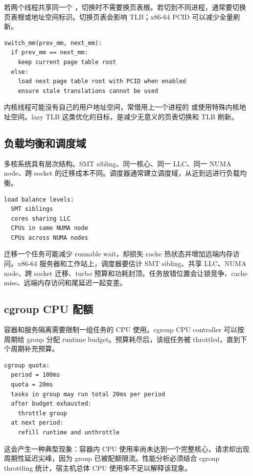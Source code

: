 若两个线程共享同一个 ，切换时不需要换页表根。若切到不同进程，通常要切换页表根或地址空间标识。切换页表会影响 TLB；x86-64 PCID 可以减少全量刷新。

\begin{lstlisting}
switch_mm(prev_mm, next_mm):
  if prev_mm == next_mm:
    keep current page table root
  else:
    load next page table root with PCID when enabled
    ensure stale translations cannot be used
\end{lstlisting}

内核线程可能没有自己的用户地址空间，常借用上一个进程的  或使用特殊内核地址空间。lazy TLB 这类优化的目标，是减少无意义的页表切换和 TLB 刷新。

\subsection{负载均衡和调度域}

多核系统具有层次结构。SMT sibling、同一核心、同一 LLC、同一 NUMA node、跨 socket 的迁移成本不同。调度器通常建立调度域，从近到远进行负载均衡。

\begin{lstlisting}
load balance levels:
  SMT siblings
  cores sharing LLC
  CPUs in same NUMA node
  CPUs across NUMA nodes
\end{lstlisting}

迁移一个任务可能减少 runnable wait，却损失 cache 热状态并增加远端内存访问。x86-64 服务器和工作站上，调度器要估计 SMT sibling、共享 LLC、NUMA node、跨 socket 迁移、turbo 预算和功耗封顶。任务放错位置会让锁竞争、cache miss、远端内存访问和尾延迟一起变差。

\subsection{cgroup CPU 配额}

容器和服务隔离需要限制一组任务的 CPU 使用。cgroup CPU controller 可以按周期给 group 分配 runtime budget。预算耗尽后，该组任务被 throttled，直到下个周期补充预算。

\begin{lstlisting}
cgroup quota:
  period = 100ms
  quota = 20ms
  tasks in group may run total 20ms per period
  after budget exhausted:
    throttle group
  at next period:
    refill runtime and unthrottle
\end{lstlisting}

这会产生一种典型现象：容器内 CPU 使用率尚未达到一个完整核心，请求却出现周期性延迟尖峰，因为 group 已被配额限流。性能分析必须结合 cgroup throttling 统计，宿主机总体 CPU 使用率不足以解释该现象。

